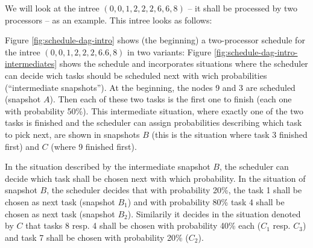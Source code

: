 We will look at the intree $(0,0,1,2,2,2,6,6,8)$ -- it shall be processed by two processors -- as an example. This intree looks as follows:

\begin{center}
\end{center}

Figure \ref{fig:schedule-dag-intro} shows (the beginning) a two-processor schedule for the intree $(0,0,1,2,2,2,6.6,8)$ in two variants: Figure \ref{fig:schedule-dag-intro-intermediates} shows the schedule and incorporates situations where the scheduler can decide wich tasks should be scheduled next with wich probabilities (``intermediate snapshots''). At the beginning, the nodes 9 and 3 are scheduled (snapshot $A$). Then each of these two tasks is the first one to finish (each one with probability 50\%). This intermediate situation, where exactly one of the two tasks is finished and the scheduler can assign probabilities describing which task to pick next, are shown in snapshots $B$ (this is the situation where task 3 finished first) and $C$ (where 9 finished first).

In the situation described by the intermediate snapshot $B$, the scheduler can decide which task shall be chosen next with which probability. In the situation of snapshot $B$, the scheduler decides that with probability 20\%, the task 1 shall be chosen as next task (snapshot $B_1$) and with probability 80\% task 4 shall be chosen as next task (snapshot $B_2$). Similarily it decides in the situation denoted by $C$ that tasks 8 resp. 4 shall be chosen with probability 40\% each ($C_1$ resp. $C_3$) and task 7 shall be chosen with probability 20\% ($C_2$).

